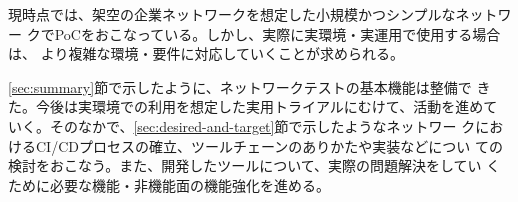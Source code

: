 現時点では、架空の企業ネットワークを想定した小規模かつシンプルなネットワー
クでPoCをおこなっている。しかし、実際に実環境・実運用で使用する場合は、
より複雑な環境・要件に対応していくことが求められる。

\ref{sec:summary}節で示したように、ネットワークテストの基本機能は整備で
きた。今後は実環境での利用を想定した実用トライアルにむけて、活動を進めて
いく。そのなかで、\ref{sec:desired-and-target}節で示したようなネットワー
クにおけるCI/CDプロセスの確立、ツールチェーンのありかたや実装などについ
ての検討をおこなう。また、開発したツールについて、実際の問題解決をしてい
くために必要な機能・非機能面の機能強化を進める。


